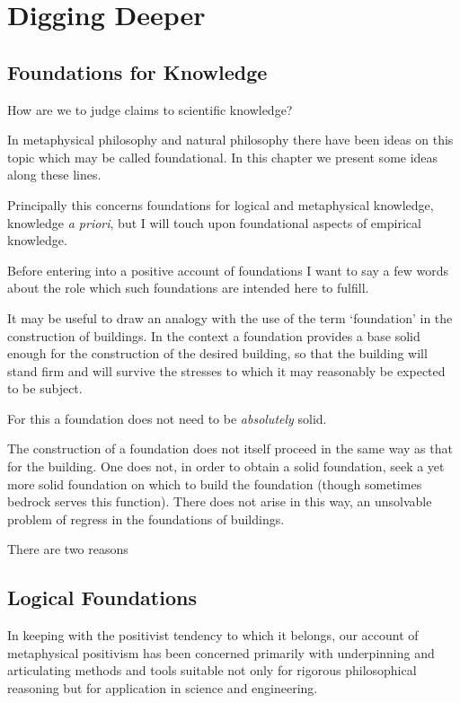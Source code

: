 
\chapter{Digging Deeper}\label{DiggingDeeper}

\section{Foundations for Knowledge}

How are we to judge claims to scientific knowledge?

In metaphysical philosophy and natural philosophy there have been
ideas on this topic which may be called foundational.
In this chapter we present some ideas along these lines.

Principally this concerns foundations for logical and metaphysical
knowledge, knowledge \emph{a priori}, but I will touch upon
foundational aspects of empirical knowledge.

Before entering into a positive account of foundations I want to say a
few words about the role which such foundations are intended here to
fulfill.

It may be useful to draw an analogy with the use of the term
`foundation' in the construction of buildings.
In the context a foundation provides a base solid enough for the
construction of the desired building, so that the building will
stand firm and will survive the stresses to which it may reasonably be
expected to be subject.

For this a foundation does not need to be \emph{absolutely} solid.

The construction of a foundation does not itself proceed in the same
way as that for the building.
One does not, in order to obtain a solid foundation, seek a yet more
solid foundation on which to build the foundation (though sometimes
bedrock serves this function).
There does not arise in this way, an unsolvable problem of regress in
the foundations of buildings.

There are two reasons


\section{Logical Foundations}

In keeping with the positivist tendency to which it belongs, our
account of metaphysical positivism has been concerned primarily with
underpinning and articulating methods and tools suitable not only for
rigorous philosophical reasoning but for application in science and
engineering.


